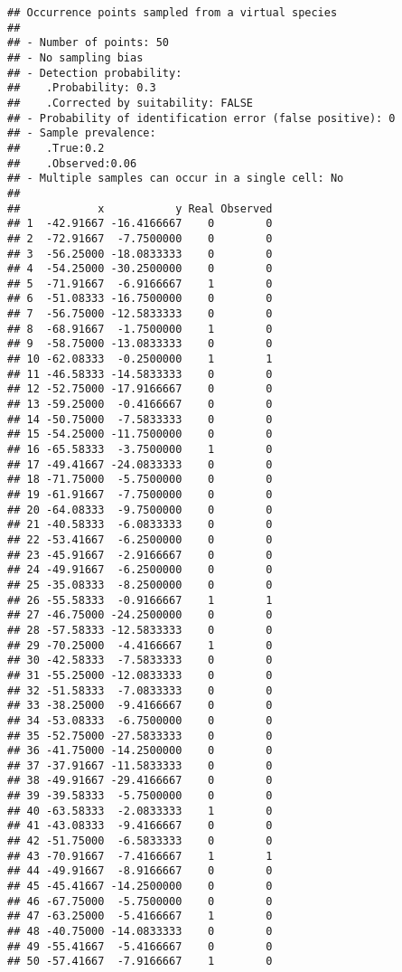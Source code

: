 \documentclass[]{article}
\begin{document}
\begin{verbatim}
## Occurrence points sampled from a virtual species
## 
## - Number of points: 50
## - No sampling bias
## - Detection probability: 
##    .Probability: 0.3
##    .Corrected by suitability: FALSE
## - Probability of identification error (false positive): 0
## - Sample prevalence: 
##    .True:0.2
##    .Observed:0.06
## - Multiple samples can occur in a single cell: No
## 
##            x           y Real Observed
## 1  -42.91667 -16.4166667    0        0
## 2  -72.91667  -7.7500000    0        0
## 3  -56.25000 -18.0833333    0        0
## 4  -54.25000 -30.2500000    0        0
## 5  -71.91667  -6.9166667    1        0
## 6  -51.08333 -16.7500000    0        0
## 7  -56.75000 -12.5833333    0        0
## 8  -68.91667  -1.7500000    1        0
## 9  -58.75000 -13.0833333    0        0
## 10 -62.08333  -0.2500000    1        1
## 11 -46.58333 -14.5833333    0        0
## 12 -52.75000 -17.9166667    0        0
## 13 -59.25000  -0.4166667    0        0
## 14 -50.75000  -7.5833333    0        0
## 15 -54.25000 -11.7500000    0        0
## 16 -65.58333  -3.7500000    1        0
## 17 -49.41667 -24.0833333    0        0
## 18 -71.75000  -5.7500000    0        0
## 19 -61.91667  -7.7500000    0        0
## 20 -64.08333  -9.7500000    0        0
## 21 -40.58333  -6.0833333    0        0
## 22 -53.41667  -6.2500000    0        0
## 23 -45.91667  -2.9166667    0        0
## 24 -49.91667  -6.2500000    0        0
## 25 -35.08333  -8.2500000    0        0
## 26 -55.58333  -0.9166667    1        1
## 27 -46.75000 -24.2500000    0        0
## 28 -57.58333 -12.5833333    0        0
## 29 -70.25000  -4.4166667    1        0
## 30 -42.58333  -7.5833333    0        0
## 31 -55.25000 -12.0833333    0        0
## 32 -51.58333  -7.0833333    0        0
## 33 -38.25000  -9.4166667    0        0
## 34 -53.08333  -6.7500000    0        0
## 35 -52.75000 -27.5833333    0        0
## 36 -41.75000 -14.2500000    0        0
## 37 -37.91667 -11.5833333    0        0
## 38 -49.91667 -29.4166667    0        0
## 39 -39.58333  -5.7500000    0        0
## 40 -63.58333  -2.0833333    1        0
## 41 -43.08333  -9.4166667    0        0
## 42 -51.75000  -6.5833333    0        0
## 43 -70.91667  -7.4166667    1        1
## 44 -49.91667  -8.9166667    0        0
## 45 -45.41667 -14.2500000    0        0
## 46 -67.75000  -5.7500000    0        0
## 47 -63.25000  -5.4166667    1        0
## 48 -40.75000 -14.0833333    0        0
## 49 -55.41667  -5.4166667    0        0
## 50 -57.41667  -7.9166667    1        0
\end{verbatim}
\end{document}
